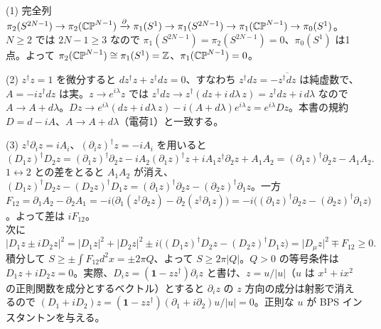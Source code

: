 \begin{solution}
(1) 完全列 $\pi_2(S^{2N-1})\to\pi_2(\mathbb{CP}^{N-1})\xrightarrow{\partial}\pi_1(S^1)\to\pi_1(S^{2N-1})\to\pi_1(\mathbb{CP}^{N-1})\to\pi_0(S^1)$。$N\ge2$ では $2N-1\ge3$ なので $\pi_1(S^{2N-1})=\pi_2(S^{2N-1})=0$、$\pi_0(S^1)$ は1点。よって $\pi_2(\mathbb{CP}^{N-1})\cong\pi_1(S^1)=\mathbb{Z}$、$\pi_1(\mathbb{CP}^{N-1})=0$。

(2) $z^\dagger z=1$ を微分すると $dz^\dagger z+z^\dagger dz=0$、すなわち $z^\dagger dz=-\overline{z^\dagger dz}$ は純虚数で、$A=-iz^\dagger dz$ は実。$z\to e^{i\lambda}z$ では $z^\dagger dz\to z^\dagger(dz+i\,d\lambda\,z)=z^\dagger dz+i\,d\lambda$ なので $A\to A+d\lambda$。$Dz\to e^{i\lambda}(dz+i\,d\lambda\,z)-i(A+d\lambda)e^{i\lambda}z=e^{i\lambda}Dz$。本書の規約 $D=d-iA$、$A\to A+d\lambda$（電荷1）と一致する。

(3) $z^\dagger\partial_iz=iA_i$、$(\partial_iz)^\dagger z=-iA_i$ を用いると
\[
(D_1z)^\dagger D_2z=(\partial_1z)^\dagger\partial_2z-iA_2(\partial_1z)^\dagger z+iA_1z^\dagger\partial_2z+A_1A_2=(\partial_1z)^\dagger\partial_2z-A_1A_2 .
\]
$1\leftrightarrow2$ との差をとると $A_1A_2$ が消え、$(D_1z)^\dagger D_2z-(D_2z)^\dagger D_1z=(\partial_1z)^\dagger\partial_2z-(\partial_2z)^\dagger\partial_1z$。一方 $F_{12}=\partial_1A_2-\partial_2A_1=-i\bigl(\partial_1(z^\dagger\partial_2z)-\partial_2(z^\dagger\partial_1z)\bigr)=-i\bigl((\partial_1z)^\dagger\partial_2z-(\partial_2z)^\dagger\partial_1z\bigr)$。よって差は $iF_{12}$。\\
次に
\[
\lvert D_1z\pm iD_2z\rvert^2=\lvert D_1z\rvert^2+\lvert D_2z\rvert^2\pm i\bigl((D_1z)^\dagger D_2z-(D_2z)^\dagger D_1z\bigr)=\lvert D_\mu z\rvert^2\mp F_{12}\ge0 .
\]
積分して $S\ge\pm\int F_{12}d^2x=\pm2\pi Q$、よって $S\ge2\pi\lvert Q\rvert$。$Q>0$ の等号条件は $D_1z+iD_2z=0$。実際、$D_iz=(\mathbf 1-zz^\dagger)\partial_iz$ と書け、$z=u/\lvert u\rvert$（$u$ は $x^1+ix^2$ の正則関数を成分とするベクトル）とすると $\partial_iz$ の $z$ 方向の成分は射影で消えるので $(D_1+iD_2)z=(\mathbf 1-zz^\dagger)(\partial_1+i\partial_2)u/\lvert u\rvert=0$。正則な $u$ が BPS インスタントンを与える。


\end{solution}
